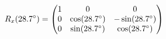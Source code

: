 \documentclass[preview]{standalone}
\begin{document}
\begin{align*}
\special{dvisvgm:raw <g id='unique000'>}R_x(28.7^\circ) = \begin{pmatrix} 1 & 0 & 0 \\ 0 & \cos(28.7^\circ) & -\sin(28.7^\circ) \\ 0 & \sin(28.7^\circ) & \cos(28.7^\circ) \end{pmatrix}\special{dvisvgm:raw </g>}
\end{align*}
\end{document}

